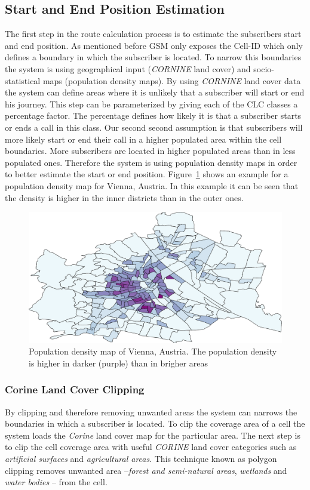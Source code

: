 \documentclass[master,english]{hgbthesis}
\begin{document}
\subsection{Start and End Position Estimation}
The first step in the route calculation process is to estimate the subscribers start and end position. As mentioned before GSM only exposes the Cell-ID which only defines a boundary in which the subscriber is located. To narrow this boundaries the system is using geographical input (\emph{CORNINE} land cover) and socio-statistical maps (population density maps). 
By using \emph{CORNINE} land cover data the system can define areas where it is unlikely that a subscriber will start or end his journey. This step can be parameterized by giving each of the CLC classes a percentage factor. The percentage defines how likely it is that a subscriber starts or ends a call in this class.
Our second second assumption is that subscribers will more likely start or end their call in a higher populated area within the cell boundaries. More subscribers are located in higher populated areas than in less populated ones. Therefore the system is using population density maps in order to better estimate the start or end position. Figure~\ref{fig:pop_vienna} shows an example for a population density map for Vienna, Austria. In this example it can be seen that the density is higher in the inner districts than in the outer ones.
\begin{figure}
	\centering
	\includegraphics[width=0.7\linewidth]{./images/pop_vienna}
	\caption{Population density map of Vienna, Austria. The population density is higher in darker (purple) than in brigher areas}
	\label{fig:pop_vienna}
\end{figure}
\subsubsection{Corine Land Cover Clipping}
By clipping and therefore removing unwanted areas the system can narrows the boundaries in which a subscriber is located. To clip the coverage area of a cell the system loads the \emph{Corine} land cover map for the particular area. The next step is to clip the cell coverage area with useful \emph{CORINE} land cover categories such as \emph{artificial surfaces} and \emph{agricultural areas}. This technique known as polygon clipping removes unwanted area --\emph{forest and semi-natural areas}, \emph{wetlands} and \emph{water bodies} -- from the cell. 
\end{document}
